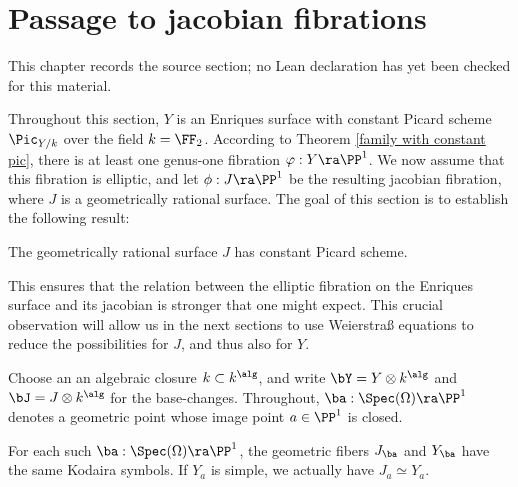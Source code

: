 \chapter{Passage to   jacobian   fibrations}
\label{no-enriques-surface-over-the-integers-chapter-10}

\begin{remark}
\label{no-enriques-surface-over-the-integers-chapter-10-source}
This chapter records the source section; no Lean declaration has yet been checked for this material.
\notready
\end{remark}

\label{Passage to jacobian}

Throughout this section, $Y$ is an Enriques surface with constant Picard scheme $\Pic_{Y/k}$ over the field $k=\FF_2$.
According to Theorem \ref{family with constant pic},
there is at least one  genus-one fibration $\varphi:Y\ra\PP^1$.
We now assume that this fibration is elliptic,  and let
$\phi:J\ra\PP^1$ be the resulting jacobian fibration, where $J$ is a  geometrically rational surface.
The goal of this section is to establish the following result:

\begin{theorem}
\notready
\label{jacobian constant pic}
The geometrically rational surface $J$ has constant Picard scheme.
\end{theorem}

This ensures that the relation between the elliptic fibration on the Enriques surface
and its jacobian is stronger that one might expect. This crucial observation will allow us in the next sections
to use Weierstra\ss{} equations to reduce the possibilities for $J$, and thus   also for $Y$.

Choose an an algebraic closure $k\subset k^\alg$, and write $\bY=Y\otimes k^\alg$ and $\bJ=J\otimes k^\alg$
for the   base-changes.
Throughout, $\ba:\Spec(\Omega)\ra \PP^1$ denotes a  geometric point   whose image
point $a\in \PP^1$ is closed.

\begin{proposition}
\notready
\label{same symbols}
For each  such  $\ba:\Spec(\Omega)\ra \PP^1$, the geometric fibers $J_\ba$ and $Y_\ba$ have the same Kodaira symbols.
If  $Y_a$ is simple,  we actually have $J_a\simeq Y_a$.
\end{proposition}

